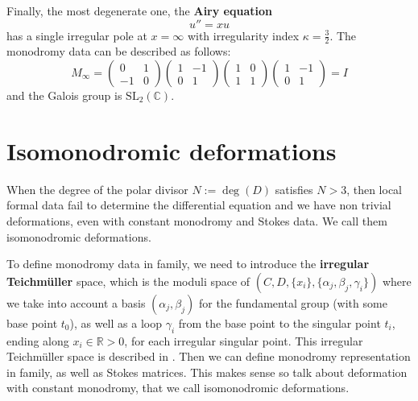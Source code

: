 \documentclass[12]{amsart}
\newcommand{\SL}{\mathrm{SL}_2}
\begin{document}
Finally, the most degenerate one, the {\bf Airy equation}
\begin{equation}\label{eq:Airy}
u''=xu
\end{equation}
has a single irregular pole at $x=\infty$ with irregularity index $\kappa=\frac{3}{2}$.
The monodromy data can be described as follows:
$$M_\infty=\begin{pmatrix}0&1\\ -1&0\end{pmatrix}
\begin{pmatrix}1&-1\\ 0&1\end{pmatrix}\begin{pmatrix}1&0\\ 1&1\end{pmatrix}\begin{pmatrix}1&-1\\ 0&1\end{pmatrix}=I$$
and the Galois group is $\SL(\mathbb C)$.


\section{Isomonodromic deformations}\label{sec:IsomDef}

When the degree of the polar divisor $N:=\deg(D)$ satisfies  $N>3$, then local formal data fail to determine 
the differential equation and we have non trivial deformations, even with constant monodromy
and Stokes data. We call them isomonodromic deformations. 


To define monodromy data in family, we need to introduce the {\bf irregular Teichm\"uller} space, 
which is the moduli space of $(C,D,\{x_i\},\{\alpha_j,\beta_j,\gamma_i\})$
where we take into account a basis $(\alpha_j,\beta_j)$ for the fundamental group (with some base point $t_0$), 
as well as a loop $\gamma_i$ from the base point
to the singular point $t_i$, ending along $x_i\in\mathbb R>0$, for each irregular singular point.
This irregular Teichm\"uller space is described in \cite{Krichever,Heu}. Then we can define monodromy
representation in family, as well as Stokes matrices. This makes sense so talk about deformation with constant 
monodromy, that we call isomonodromic deformations.
\end{document}
